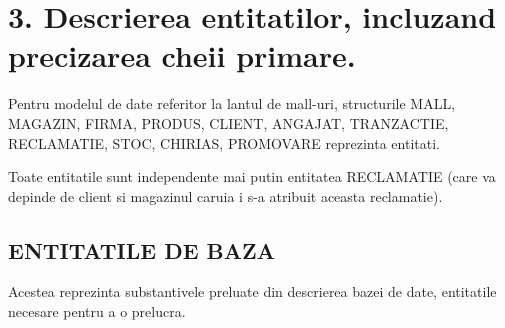 
\section*{3. Descrierea entitatilor, incluzand precizarea cheii primare.}

\vspace{1cm}

Pentru modelul de date referitor la lantul de mall-uri, structurile MALL, MAGAZIN, FIRMA, PRODUS, CLIENT, ANGAJAT, TRANZACTIE, RECLAMATIE, STOC,
CHIRIAS, PROMOVARE reprezinta entitati.

Toate entitatile sunt independente mai putin entitatea RECLAMATIE (care va
depinde de client si magazinul caruia i s-a atribuit aceasta reclamatie).

\subsection*{\centering ENTITATILE DE BAZA}

Acestea reprezinta substantivele preluate din descrierea bazei de date, entitatile necesare pentru a o prelucra.

\vspace{0.5cm}

